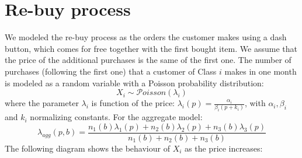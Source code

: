 \documentclass[12pt,a4paper]{report}
\begin{document}
		\section{Re-buy process}
We modeled the re-buy process as the orders the customer makes using a dash button, which comes for free together with the first bought item. We assume that the price of the additional purchases is the same of the first one.
The number of purchases (following the first one) that a customer of Class $i$ makes in one month is modeled as a random variable with a Poisson probability distribution:
\[X_i \sim  \mathcal{P}oisson   (\lambda_i) \]
where the parameter $\lambda_i$ is function of the price: $\lambda_i(p) = \frac{\alpha_i}{\beta_i(p+k_i)}$, with $\alpha_i, \beta_i$ and $k_i$ normalizing constants.
For the aggregate model:
\[\lambda_{agg}(p,b) =\frac{n_1(b)\lambda_1(p)+n_2(b) \lambda_2(p)+n_3(b) \lambda_3(p)}{n_1(b)+n_2(b)+n_3(b)} \] The following diagram shows the behaviour of $X_i$ as the price increases:
\end{document}
